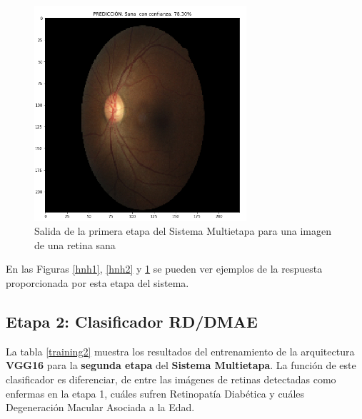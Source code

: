 \documentclass[
  12pt,
  spanish,
  a4paperpaper,
]{report}
\begin{document}
\begin{figure}
\centering
\includegraphics[width=0.7\textwidth,height=\textheight]{source/figures/hnh3.png}
\caption{Salida de la primera etapa del Sistema Multietapa para una
imagen de una retina sana \label{hnh3}}
\end{figure}

En las Figuras \ref{hnh1}, \ref{hnh2} y \ref{hnh3} se pueden ver
ejemplos de la respuesta proporcionada por esta etapa del sistema.

\newpage

\hypertarget{etapa-2-clasificador-rddmae}{%
\subsection{Etapa 2: Clasificador
RD/DMAE}\label{etapa-2-clasificador-rddmae}}

La tabla \ref{training2} muestra los resultados del entrenamiento de la
arquitectura \textbf{VGG16} para la \textbf{segunda etapa} del
\textbf{Sistema Multietapa}. La función de este clasificador es
diferenciar, de entre las imágenes de retinas detectadas como enfermas
en la etapa 1, cuáles sufren Retinopatía Diabética y cuáles Degeneración
Macular Asociada a la Edad.
\end{document}
